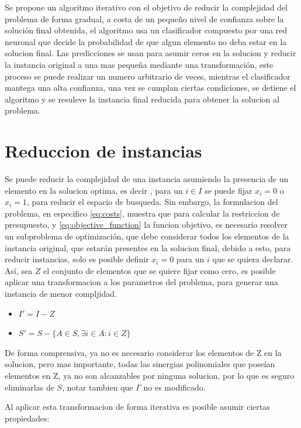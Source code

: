 \documentclass[spanish, a4paper, 12pt, twoside, openany,final]{book}
\numberwithin{equation}{section}                %
\begin{document}
Se propone un algoritmo iterativo con el objetivo de reducir la complejidad del problema de forma gradual, a costa de un pequeño nivel de confianza sobre la solución final obtenida, el algoritmo usa un clasificador compuesto por una red neuronal que decide la probabilidad de que algun elemento no deba estar en la solucion final. Las predicciones se usan para asumir ceros en la solucion y reducir la instancia original a una mas pequeña mediante una transformación, este proceso se puede realizar un numero arbitrario de veces, mientras el clasificador mantega una alta confianza, una vez se cumplan ciertas condiciones, se detiene el algoritmo y se resuleve la instancia final reducida para obtener la solucion al problema.




\section{Reduccion de instancias}

Se puede reducir la complejidad de una instancia asumiendo la presencia de un elemento en la solucion optima, es decir , para un $i \in I$ se puede fijar $x_i=0$ o $x_i = 1$, para reducir el espacio de busqueda. Sin embargo, la formulacion del problema, en especifico \ref{eq:costs}, muestra que para calcular la restriccion de presupuesto, y \ref{eq:objective_function} la funcion objetivo, es necesario resolver un subproblema de optimización, que debe considerar todos los elementos de la instancia original, que estarán presentes en la solucion final, debido a esto, para reducir instancias, solo es posible definir $x_i=0$ para un $i$ que se quiera declarar. Así, sea $Z$ el conjunto de elementos que se quiere fijar como cero, es posible aplicar una transformacion a los parametros del problema, para generar una instancia de menor compljidad.

	
\begin{itemize}
	\item $I' = I - Z$
	\item $S' = S - \{A \in S, \exists i \in A: i \in Z\} $
\end{itemize}


De forma comprensiva, ya no es necesario considerar los elementos de Z en la solucion, pero mas importante,
todas las sinergias polinomiales que poseían elementos en Z, ya no son alcanzables por ninguna solucion, por lo que es seguro eliminarlas de $S$, notar tambien que $\Gamma$ no es modificado.

Al aplicar esta transformacion de forma iterativa es posible asumir ciertas propiedades:
\end{document}
